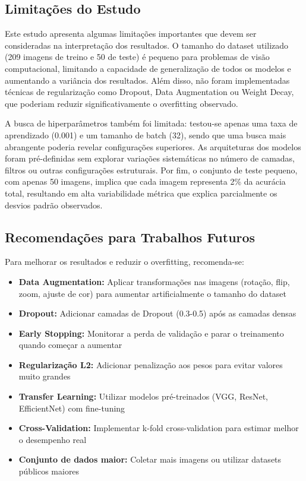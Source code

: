 \documentclass[a4paper,12pt]{article}
\begin{document}
\subsection{Limitações do Estudo}

Este estudo apresenta algumas limitações importantes que devem ser consideradas na interpretação dos resultados. O tamanho do dataset utilizado (209 imagens de treino e 50 de teste) é pequeno para problemas de visão computacional, limitando a capacidade de generalização de todos os modelos e aumentando a variância dos resultados. Além disso, não foram implementadas técnicas de regularização como Dropout, Data Augmentation ou Weight Decay, que poderiam reduzir significativamente o overfitting observado.

A busca de hiperparâmetros também foi limitada: testou-se apenas uma taxa de aprendizado (0.001) e um tamanho de batch (32), sendo que uma busca mais abrangente poderia revelar configurações superiores. As arquiteturas dos modelos foram pré-definidas sem explorar variações sistemáticas no número de camadas, filtros ou outras configurações estruturais. Por fim, o conjunto de teste pequeno, com apenas 50 imagens, implica que cada imagem representa 2\% da acurácia total, resultando em alta variabilidade métrica que explica parcialmente os desvios padrão observados.

\subsection{Recomendações para Trabalhos Futuros}

Para melhorar os resultados e reduzir o overfitting, recomenda-se:

\begin{itemize}
    \item \textbf{Data Augmentation:} Aplicar transformações nas imagens (rotação, flip, zoom, ajuste de cor) para aumentar artificialmente o tamanho do dataset
    \item \textbf{Dropout:} Adicionar camadas de Dropout (0.3-0.5) após as camadas densas
    \item \textbf{Early Stopping:} Monitorar a perda de validação e parar o treinamento quando começar a aumentar
    \item \textbf{Regularização L2:} Adicionar penalização aos pesos para evitar valores muito grandes
    \item \textbf{Transfer Learning:} Utilizar modelos pré-treinados (VGG, ResNet, EfficientNet) com fine-tuning
    \item \textbf{Cross-Validation:} Implementar k-fold cross-validation para estimar melhor o desempenho real
    \item \textbf{Conjunto de dados maior:} Coletar mais imagens ou utilizar datasets públicos maiores
\end{itemize}
\end{document}
